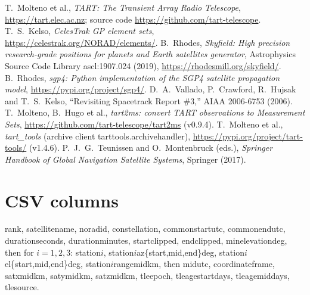 \documentclass[11pt,a4paper]{article}
\newcommand{\code}[1]{{\ttfamily\def\_{\textunderscore\allowbreak}#1}}
\begin{document}
\begin{thebibliography}{99}
 T.~Molteno et al., \emph{TART: The Transient Array Radio
Telescope}, \url{https://tart.elec.ac.nz}; source code
\url{https://github.com/tart-telescope}.
 T.~S.~Kelso, \emph{CelesTrak GP element sets},
\url{https://celestrak.org/NORAD/elements/}.
 B.~Rhodes, \emph{Skyfield: High precision research-grade
positions for planets and Earth satellites generator}, Astrophysics Source
Code Library ascl:1907.024 (2019), \url{https://rhodesmill.org/skyfield/}.
 B.~Rhodes, \emph{sgp4: Python implementation of the SGP4
satellite propagation model}, \url{https://pypi.org/project/sgp4/}.
 D.~A.~Vallado, P.~Crawford, R.~Hujsak and T.~S.~Kelso,
``Revisiting Spacetrack Report \#3,'' AIAA 2006-6753 (2006).
 T.~Molteno, B.~Hugo et al., \emph{tart2ms: convert TART
observations to Measurement Sets}, \url{https://github.com/tart-telescope/tart2ms}
(v0.9.4).
 T.~Molteno et al., \emph{tart\_tools} (archive client
\code{tart\_tools.archive\_handler}), \url{https://pypi.org/project/tart-tools/} (v1.4.6).
 P.~J.~G.~Teunissen and O.~Montenbruck (eds.),
\emph{Springer Handbook of Global Navigation Satellite Systems}, Springer (2017).
\end{thebibliography}

\appendix
\section{CSV columns}
\small
\code{rank, satellite\_name, norad\_id, constellation, common\_start\_utc,
common\_end\_utc, duration\_seconds, duration\_minutes, start\_clipped,
end\_clipped, min\_elevation\_deg}, then for $i=1,2,3$:
\code{station\_$i$, station\_$i$\_az\_\{start,mid,end\}\_deg,
station\_$i$\_el\_\{start,mid,end\}\_deg, station\_$i$\_range\_mid\_km}, then
\code{mid\_utc, coordinate\_frame, sat\_x\_mid\_km, sat\_y\_mid\_km,
sat\_z\_mid\_km, tle\_epoch, tle\_age\_start\_days, tle\_age\_mid\_days,
tle\_source}.
\end{document}
